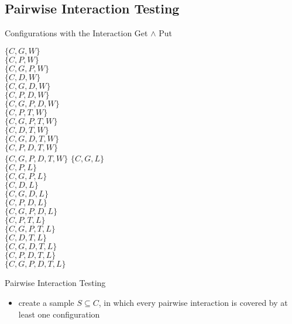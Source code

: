 \subsection{Pairwise Interaction Testing}
\begin{frame}{\myframetitle{} }
	\begin{mycolumns}
		\begin{example}{Configurations with the Interaction Get $\wedge$ Put}
			\footnotesize
			\begin{mycolumns}[animation=none,widths={55,45}]
				$\{C,G,W\}$\\
				$\{C,P,W\}$\\
				\emph{$\{C,G,P,W\}$}\\
				$\{C,D,W\}$\\
				$\{C,G,D,W\}$\\
				$\{C,P,D,W\}$\\
				\emph{$\{C,G,P,D,W\}$}\\
				$\{C,P,T,W\}$\\
				\emph{$\{C,G,P,T,W\}$}\\
				$\{C,D,T,W\}$\\
				$\{C,G,D,T,W\}$\\
				$\{C,P,D,T,W\}$\\
				\emph{$\{C,G,P,D,T,W\}$}
			\mynextcolumn
				$\{C,G,L\}$\\
				$\{C,P,L\}$\\
				\emph{$\{C,G,P,L\}$}\\
				$\{C,D,L\}$\\
				$\{C,G,D,L\}$\\
				$\{C,P,D,L\}$\\
				\emph{$\{C,G,P,D,L\}$}\\
				$\{C,P,T,L\}$\\
				\emph{$\{C,G,P,T,L\}$}\\
				$\{C,D,T,L\}$\\
				$\{C,G,D,T,L\}$\\
				$\{C,P,D,T,L\}$\\
				\emph{$\{C,G,P,D,T,L\}$}
			\end{mycolumns}
		\end{example}
		\pause
		\begin{definition}{Pairwise Interaction Testing}
			\begin{itemize}
				\setlength\itemsep{.5em}
				\item create a sample $S \subseteq C$, in which every pairwise interaction is covered by at least one configuration %

\end{itemize}
\end{definition}
\end{mycolumns}
\end{frame}
